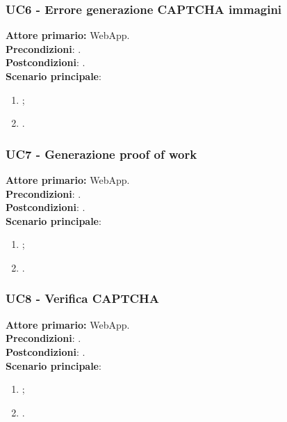 \subsubsection{UC6 - Errore generazione CAPTCHA immagini}
\textbf{Attore primario:} WebApp.\\
\textbf{Precondizioni}: .\\
\textbf{Postcondizioni}: .\\

\textbf{Scenario principale}:
\begin{enumerate}
    \item ;
	\item .
\end{enumerate}

\subsubsection{UC7  - Generazione proof of work}
\textbf{Attore primario:} WebApp.\\
\textbf{Precondizioni}: .\\
\textbf{Postcondizioni}: .\\

\textbf{Scenario principale}:
\begin{enumerate}
    \item ;
	\item .
\end{enumerate}

\subsubsection{UC8 - Verifica CAPTCHA}
\textbf{Attore primario:} WebApp.\\
\textbf{Precondizioni}: .\\
\textbf{Postcondizioni}: .\\

\textbf{Scenario principale}:
\begin{enumerate}
    \item ;
	\item .
\end{enumerate}

